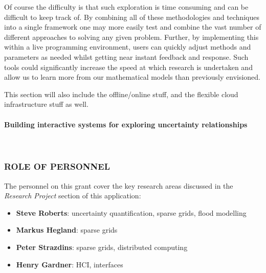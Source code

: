 \documentclass[a4paper,fontsize=12pt]{scrartcl}
\begin{document}
Of course the difficulty is that such exploration is time consuming
and can be difficult to keep track of. By combining all of these
methodologies and techniques into a single framework one may more
easily test and combine the vast number of different approaches to
solving any given problem. Further, by implementing this within a live
programming environment, users can quickly adjust methods and
parameters as needed whilst getting near instant feedback and
response. Such tools could significantly increase the speed at which
research is undertaken and allow us to learn more from our
mathematical models than previously envisioned.

This section will also include the offline/online stuff, and the
flexible cloud infrastructure stuff as well.

\paragraph*{Building interactive systems for exploring uncertainty relationships}\mbox{}\\



\subsubsection*{ROLE OF PERSONNEL}

The personnel on this grant cover the key research areas discussed in
the \emph{Research Project} section of this application:

\begin{itemize}
\item \textbf{Steve Roberts}: uncertainty quantification, sparse grids, flood
  modelling
\item \textbf{Markus Hegland}: sparse grids
\item \textbf{Peter Strazdins}: sparse grids, distributed computing
\item \textbf{Henry Gardner}: HCI, interfaces
\end{itemize}
\end{document}
